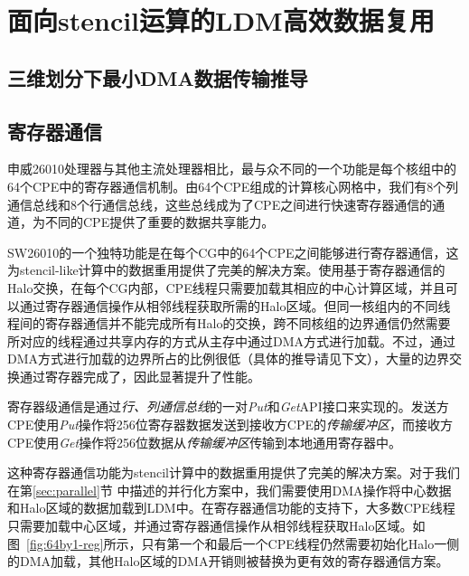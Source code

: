 \documentclass[degree=doctor]{thuthesis}
\begin{document}




\section{面向stencil运算的LDM高效数据复用} %
\label{sec:面向stencil运算的ldm高效数据复用}



\subsection{三维划分下最小DMA数据传输推导} %
\label{sub:三维划分下最小DMA数据传输推导}



\subsection{寄存器通信}
\label{sub:寄存器通信}
申威26010处理器与其他主流处理器相比，最与众不同的一个功能是每个核组中的64个CPE中的寄存器通信机制。由64个CPE组成的计算核心网格中，我们有8个列通信总线和8个行通信总线，这些总线成为了CPE之间进行快速寄存器通信的通道，为不同的CPE提供了重要的数据共享能力。

SW26010的一个独特功能是在每个CG中的64个CPE之间能够进行寄存器通信，这为stencil-like计算中的数据重用提供了完美的解决方案。使用基于寄存器通信的Halo交换，在每个CG内部，CPE线程只需要加载其相应的中心计算区域，并且可以通过寄存器通信操作从相邻线程获取所需的Halo区域。但同一核组内的不同线程间的寄存器通信并不能完成所有Halo的交换，跨不同核组的边界通信仍然需要所对应的线程通过共享内存的方式从主存中通过DMA方式进行加载。不过，通过DMA方式进行加载的边界所占的比例很低（具体的推导请见下文），大量的边界交换通过寄存器完成了，因此显著提升了性能。

寄存器级通信是通过\emph{行、列通信总线}的一对\emph{Put}和\emph{Get}API接口来实现的。发送方CPE使用\emph {Put}操作将256位寄存器数据发送到接收方CPE的\emph{传输缓冲区}，而接收方CPE使用\emph{Get}操作将256位数据从\emph{传输缓冲区}传输到本地通用寄存器中。

这种寄存器通信功能为stencil计算中的数据重用提供了完美的解决方案。对于我们在第\ref{sec:parallel}节
中描述的并行化方案中，我们需要使用DMA操作将中心数据和Halo区域的数据加载到LDM中。在寄存器通信功能的支持下，大多数CPE线程只需要加载中心区域，并通过寄存器通信操作从相邻线程获取Halo区域。如图~\ref{fig:64by1-reg}所示，只有第一个和最后一个CPE线程仍然需要初始化Halo一侧的DMA加载，其他Halo区域的DMA开销则被替换为更有效的寄存器通信方案。
\end{document}
